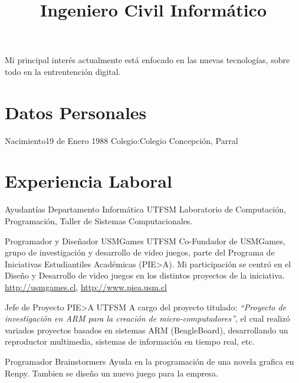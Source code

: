 \documentclass[letter,10pt]{moderncv}
\title{Ingeniero Civil Informático}               %
\begin{document}
\maketitle
\vspace{-30pt}
\begin{center}
    Mi principal interés actualmente está enfocado en las nuevas tecnologías,
    sobre todo en la entrentención digital. 

 \end{center}
\section{Datos Personales}
           {Nacimiento}{19 de Enero 1988}
           {Colegio:}{Colegio Concepción, Parral}
           {}{}

\section{Experiencia Laboral}

        {Ayudantías}
        {Departamento Informática}
        {UTFSM}
        {}
        {Laboratorio de Computación, Programación, Taller de Sistemas Computacionales.}

        {Programador y Diseñador}
        {USMGames}
        {UTFSM}
        {Co-Fundador de USMGames, grupo de investigación y desarrollo de video
        juegos, parte del Programa de Iniciativas Estudiantiles Académicas (PIE>A).
        Mi participación se centró en el Diseño y Desarrollo de video juegos
        en los distintos proyectos de la iniciativa.}
        {\url{http://usmgames.cl}, \url{http://www.piea.usm.cl}}

        {Jefe de Proyecto}
        {PIE>A}
        {UTFSM}
        {}
        {A cargo del proyecto titulado: \emph{``Proyecto de investigación en ARM
        para la creación de micro-computadores''}, el cual realizó variados
        proyectos basados en sistemas ARM (BeagleBoard), desarrollando un
        reproductor multimedia, sistemas de información en tiempo real, etc.}

        {Programador}
        {Brainstormers}
        {}
	{}
        {Ayuda en la programación de una novela grafica en Renpy. Tambien se diseño
	un nuevo juego para la empresa.}
\end{document}
